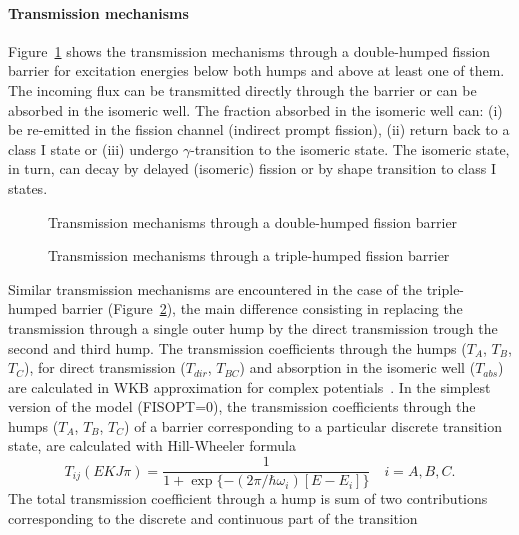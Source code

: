 \documentclass[twocolumn,amsmath,amssymb,10pt,groupedaddress,a4paper]{revtex4}
\begin{document}
\paragraph{Transmission mechanisms}
Figure~\ref{cap:Transmission-mechanisms-through-double} shows the
transmission mechanisms through a double-humped fission barrier for
excitation energies below both humps and above at least one of them.
The incoming flux can be transmitted directly through the barrier
or can be absorbed in the isomeric well. The fraction absorbed in
the isomeric well can: (i) be re-emitted in the fission channel (indirect
prompt fission), (ii) return back to a class I state or (iii) undergo
$\gamma$-transition to the isomeric state. The isomeric state, in
turn, can decay by delayed (isomeric) fission
or by shape transition to class I states.
%
\begin{figure}[htbp]
\caption{\label{cap:Transmission-mechanisms-through-double}Transmission mechanisms
through a double-humped fission barrier}
\end{figure}
%
\begin{figure}[htbp]
\caption{\label{cap:Transmission-mechanisms-through-triple}Transmission mechanisms
through a triple-humped fission barrier}
\end{figure}
Similar transmission mechanisms are encountered in the case of the
triple-humped barrier (Figure~\ref{cap:Transmission-mechanisms-through-triple}),
the main difference consisting in replacing the transmission through
a single outer hump by the direct transmission trough the second and
third hump. The transmission coefficients through the humps ($T_{A}$,
$T_{B}$, $T_{C}$), for direct transmission ($T_{dir}$, $T_{BC}$)
and absorption in the isomeric well ($T_{abs}$)
are calculated in WKB approximation for complex potentials~\cite{Back:74,Bhandari:79,Ventura-3hump}.
In the simplest version of the model (FISOPT=0), the transmission
coefficients through the humps ($T_{A}$, $T_{B}$, $T_{C}$) of a
barrier corresponding to a particular discrete transition state, are
calculated with Hill-Wheeler formula
\begin{equation}
T_{ij}(EKJ\pi)=\frac{1}{1+\exp\{-(2\pi/\hbar\omega_{i})[E-E_{i}]\}}\quad i=A,B,C.
\label{thw}
\end{equation}
 The total transmission coefficient through a hump is sum of two contributions
corresponding to the discrete and continuous part of the transition
\end{document}
